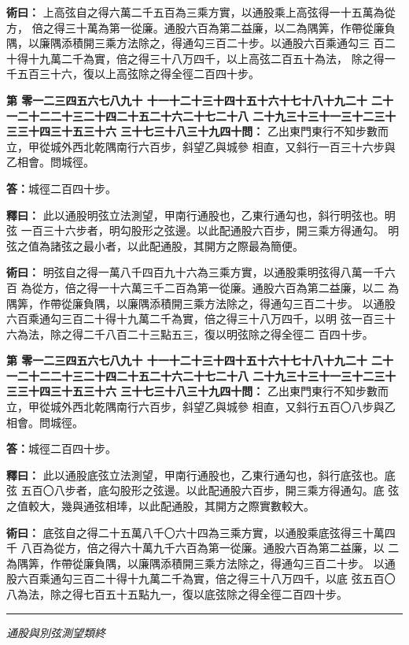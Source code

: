 \documentclass[11pt,a4paper]{article}
\newcommand{\longline}{\noindent\rule{\textwidth}{0.4pt}}
\newcounter{probnum}
\newcommand{\chnum}[1]{%
  \ifcase#1 零\or 一\or 二\or 三\or 四\or 五\or 六\or 七\or 八\or 九\or 十\or
    十一\or 十二\or 十三\or 十四\or 十五\or 十六\or 十七\or 十八\or 十九\or 二十\or
    二十一\or 二十二\or 二十三\or 二十四\or 二十五\or 二十六\or 二十七\or 二十八\or
    二十九\or 三十\or 三十一\or 三十二\or 三十三\or 三十四\or 三十五\or 三十六\or
    三十七\or 三十八\or 三十九\or 四十\fi}
\newcommand{\problem}[1]{\stepcounter{probnum}\par\noindent\textbf{第\chnum{\value{probnum}}問：}#1\par}
\newcommand{\answer}[1]{\par\noindent\textbf{答：}#1\par}
\newcommand{\shiyi}[1]{\par\noindent\textbf{釋曰：}#1\par}
\newcommand{\shuyue}[1]{\par\noindent\textbf{術曰：}#1\par}
\begin{document}
\shuyue{
上高弦自之得六萬二千五百為三乘方實，以通股乘上高弦得一十五萬為從方，
倍之得三十萬為第一從廉。通股六百為第二益廉，以二為隅筭，作帶從廉負
隅，以廉隅添積開三乘方法除之，得通勾三百二十步。以通股六百乘通勾三
百二十得十九萬二千為實，倍之得三十八万四千，以上高弦二百五十為法，
除之得一千五百三十六，復以上高弦除之得全徑二百四十步。
}

\vspace{0.3cm}
\problem{
乙出東門東行不知步數而立，甲從城外西北乾隅南行六百步，斜望乙與城參
相直，又斜行一百三十六步與乙相會。問城徑。
}

\answer{城徑二百四十步。}

\shiyi{
此以通股明弦立法測望，甲南行通股也，乙東行通勾也，斜行明弦也。明弦
一百三十六步者，明勾股形之弦邊。以此配通股六百步，開三乘方得通勾。
明弦之值為諸弦之最小者，以此配通股，其開方之際最為簡便。
}

\shuyue{
明弦自之得一萬八千四百九十六為三乘方實，以通股乘明弦得八萬一千六百
為從方，倍之得一十六萬三千二百為第一從廉。通股六百為第二益廉，以二
為隅筭，作帶從廉負隅，以廉隅添積開三乘方法除之，得通勾三百二十步。
以通股六百乘通勾三百二十得十九萬二千為實，倍之得三十八万四千，以明
弦一百三十六為法，除之得二千八百二十三點五三，復以明弦除之得全徑二
百四十步。
}

\vspace{0.3cm}
\problem{
乙出東門東行不知步數而立，甲從城外西北乾隅南行六百步，斜望乙與城參
相直，又斜行五百〇八步與乙相會。問城徑。
}

\answer{城徑二百四十步。}

\shiyi{
此以通股底弦立法測望，甲南行通股也，乙東行通勾也，斜行底弦也。底弦
五百〇八步者，底勾股形之弦邊。以此配通股六百步，開三乘方得通勾。底
弦之值較大，幾與通弦相埲，以此配通股，其開方之際實數較大。
}

\shuyue{
底弦自之得二十五萬八千〇六十四為三乘方實，以通股乘底弦得三十萬四千
八百為從方，倍之得六十萬九千六百為第一從廉。通股六百為第二益廉，以
二為隅筭，作帶從廉負隅，以廉隅添積開三乘方法除之，得通勾三百二十步。
以通股六百乘通勾三百二十得十九萬二千為實，倍之得三十八万四千，以底
弦五百〇八為法，除之得七百五十五點九一，復以底弦除之得全徑二百四十步。
}

\vspace{0.5cm}
\longline
\begin{center}
\textit{通股與別弦測望類終}
\end{center}

\newpage
\setcounter{probnum}{0}

\end{document}
